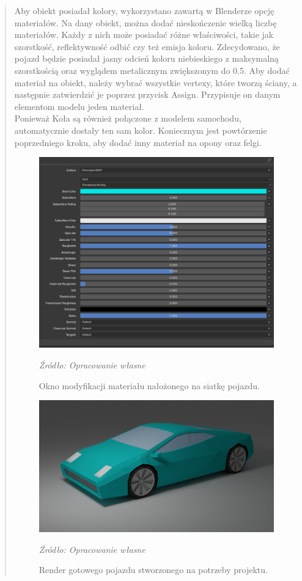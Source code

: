 \begin{quotation}
\indent Aby obiekt posiadał kolory, wykorzystano zawartą w Blenderze opcję materiałów. Na dany obiekt, można dodać nieskończenie wielką liczbę materiałów. Każdy z nich może posiadać różne właściwości, takie jak szorstkość, reflektywność odbić czy też emisja koloru. Zdecydowano, że pojazd będzie posiadał jasny odcień koloru niebieskiego z maksymalną szorstkością oraz wyglądem metalicznym zwiększonym do 0.5. Aby dodać materiał na obiekt, należy wybrać wszystkie vertexy, które tworzą ściany, a następnie zatwierdzić je poprzez przycisk Assign. Przypisuje on danym elementom modelu jeden materiał. \\ Ponieważ Koła są również połączone z modelem samochodu, automatycznie dostały ten sam kolor. Koniecznym jest powtórzenie poprzedniego kroku, aby dodać inny materiał na opony oraz felgi. 

\begin{figure}[!hbt]
\centering
  \includegraphics[width=0.8\linewidth]{materialcar.png}
  \caption{Okno modyfikacji materiału nałożonego na siatkę pojazdu.}\label{rys_13}
  \begin{minipage}[t]{0.75\linewidth}
    \emph{Źródło: Opracowanie własne}
  \end{minipage}
\end{figure}

\begin{figure}[!hbt]
\centering
  \includegraphics[width=0.8\linewidth]{car.png}
  \caption{Render gotowego pojazdu stworzonego na potrzeby projektu.}\label{rys_14}
  \begin{minipage}[t]{0.75\linewidth}
    \emph{Źródło: Opracowanie własne}
  \end{minipage}
\end{figure}


\end{quotation}
